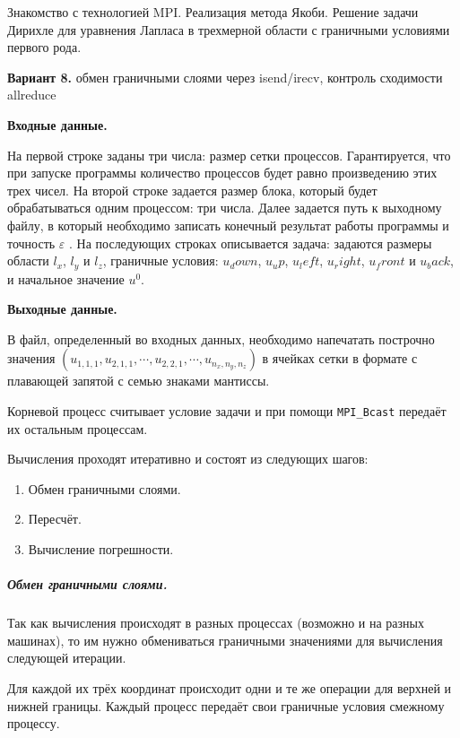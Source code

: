 \documentclass[12pt]{article}
\begin{document}


Знакомство с технологией MPI. Реализация метода Якоби.
Решение задачи Дирихле для уравнения Лапласа в трехмерной области с граничными
условиями первого рода.

\textbf{Вариант 8.} обмен граничными слоями через isend/irecv, контроль сходимости allreduce

\textbf{Входные данные.}

На первой строке заданы три числа: размер сетки
процессов. Гарантируется, что при запуске программы количество процессов будет
равно произведению этих трех чисел. На второй строке задается размер блока,
который будет обрабатываться одним процессом: три числа. Далее задается путь к
выходному файлу, в который необходимо записать конечный результат работы
программы и точность $\varepsilon$ . На последующих строках описывается задача: задаются
размеры области $l_x$, $l_y$ и $l_z$,
граничные условия: $u_down$, $u_up$, $u_left$, $u_right$, $u_front$ и $u_back$,
и начальное значение $u^0$.

\textbf{Выходные данные.}

В файл, определенный во входных данных, необходимо
напечатать построчно значения $(u_{1,1,1}, u_{2,1,1}, \cdots, u_{2,2,1}, \cdots, u_{n_x,n_y,n_z})$
в ячейках сетки в формате с плавающей запятой с семью знаками мантиссы.

\nvidia


Корневой процесс считывает условие задачи и при помощи \lstinline{MPI_Bcast} передаёт их
остальным процессам.

Вычисления проходят итеративно и состоят из следующих шагов:

\begin{enumerate}
	\item Обмен граничными слоями.
	\item Пересчёт.
	\item Вычисление погрешности.
\end{enumerate}


\subparagraph*{Обмен граничными слоями.}

Так как вычисления происходят в разных процессах (возможно и на разных машинах),
то им нужно обмениваться граничными значениями для вычисления следующей итерации.

Для каждой их трёх координат происходит одни и те же операции для верхней и нижней границы.
Каждый процесс передаёт свои граничные условия смежному процессу.
\end{document}
